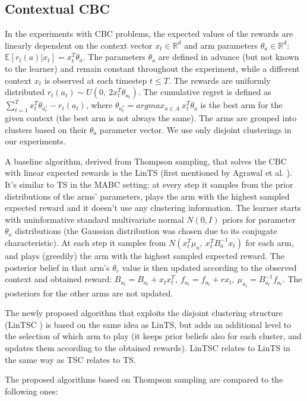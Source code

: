 \subsection{Contextual CBC}

In the experiments with CBC problems, the expected values of the rewards are linearly dependent on the context vector $x_t \in \mathbb{R}^d$ and arm parameters $\theta_a \in \mathbb{R}^d$: $\mathbb{E}[r_t(a) | x_t] = x_t^T \theta_a$. The parameters $\theta_a$ are defined in advance (but not known to the learner) and remain constant throughout the experiment, while a different context $x_t$ is observed at each timestep $t \leq T$. The rewards are uniformly distributed $r_t(a_t) \sim U(0,\ 2 x_t^T \theta_{a_t})$. The cumulative regret is defined as $\sum_{t=1}^T x_t^T \theta_{a_t^*} - r_t(a_t)$, where $\theta_{a_t^*} = arg max_{a \in A}\ x_t^T \theta_a$ is the best arm for the given context (the best arm is not always the same). The arms are grouped into clusters based on their $\theta_a$ parameter vector. We use only disjoint clusterings in our experiments.

A baseline algorithm, derived from Thompson sampling, that solves the CBC with linear expected rewards is the LinTS (first mentioned by Agrawal et al. \cite{agrawal}). It's similar to TS in the MABC setting: at every step it samples from the prior distributions of the arms' parameters, plays the arm with the highest sampled expected reward and it doesn't use any clustering information. The learner starts with uninformative standard multivariate normal $N(0, I)$ priors for parameter $\theta_a$ distributions (the Gaussian distribution was chosen due to its conjugate characteristic). At each step it samples from $N(x_t^T \mu_a,\ x_t^T B_a^{-1} x_t)$ for each arm, and plays (greedily) the arm with the highest sampled expected reward. The posterior belief in that arm's $\theta_c$ value is then updated according to the observed context and obtained reward: $B_{a_t} = B_{a_t} + x_t x_t^T,\ f_{a_t} = f_{a_t} + r x_t,\ \mu_{a_t} = B_{a_t}^{-1} f_{a_t}$. The posteriors for the other arms are not updated.

The newly proposed algorithm that exploits the disjoint clustering structure (LinTSC \cite{bandits}) is based on the same idea as LinTS, but adds an additional level to the selection of which arm to play (it keeps prior beliefs also for each cluster, and updates them according to the obtained rewards). LinTSC relates to LinTS in the same way as TSC relates to TS.

The proposed algorithms based on Thompson sampling are compared to the following ones:

